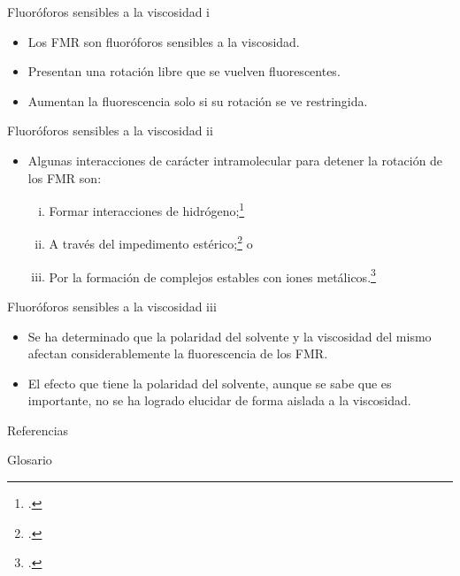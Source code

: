 \documentclass[%
spanish,
mexico]{beamer}
\begin{document}
\begin{frame}{Fluoróforos sensibles a la viscosidad i}
	\begin{itemize}
		\item Los \gls{FMR} son fluoróforos sensibles a la viscosidad.
		\item Presentan una rotación libre que se vuelven fluorescentes.
		\item Aumentan la fluorescencia solo si su rotación se ve restringida.
	\end{itemize}
\end{frame}
\begin{frame}{Fluoróforos sensibles a la viscosidad ii}
	\begin{itemize}
		\item Algunas interacciones de carácter intramolecular para detener la rotación de los \gls{FMR} son:
		      \begin{enumerate}[i.]
			      \item Formar interacciones de hidrógeno;\footcite{wuMultistageRotationalSpeed2018}
			      \item A través del impedimento estérico;\footcite{faulknerAllostericRegulationRotational2016} o
			      \item Por la formación de complejos estables con iones metálicos.\footcite{yadavViscochromicMechanochromicUnsymmetrical2019}
		      \end{enumerate}
	\end{itemize}
\end{frame}

\begin{frame}{Fluoróforos sensibles a la viscosidad iii}
	\begin{itemize}
		\item Se ha determinado que la polaridad del solvente y la viscosidad del mismo afectan considerablemente la fluorescencia de los \gls{FMR}.
		\item El efecto que tiene la polaridad del solvente, aunque se sabe que es importante, no se ha logrado elucidar de forma aislada a la viscosidad.
	\end{itemize}
\end{frame}

\begin{frame}[allowframebreaks]{Referencias}
	\small
	\printbibliography{}
\end{frame}

\begin{frame}[allowframebreaks]{Glosario}
	\small
	\printglossary[type=main,style=long,nonumberlist]
\end{frame}
\end{document}
